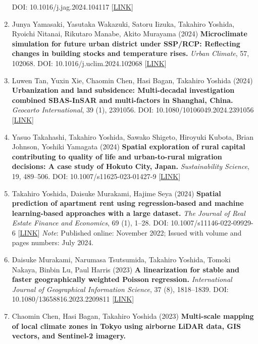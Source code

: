 \documentclass[
]{book}
\begin{document}
\begin{enumerate}
  DOI: 10.1016/j.jag.2024.104117 {[}\href{https://www.sciencedirect.com/science/article/pii/S1569843224004710}{LINK}{]}
\item
  Junya Yamasaki, Yasutaka Wakazuki, Satoru Iizuka, Takahiro Yoshida, Ryoichi Nitanai, Rikutaro Manabe, Akito Murayama (2024)
  \textbf{Microclimate simulation for future urban district under SSP/RCP: Reflecting changes in building stocks and temperature rises.}
  \emph{Urban Climate}, 57, 102068.
  DOI: 10.1016/j.uclim.2024.102068 {[}\href{https://www.sciencedirect.com/science/article/pii/S2212095524002645}{LINK}{]}
\item
  Luwen Tan, Yuxin Xie, Chaomin Chen, Hasi Bagan, Takahiro Yoshida (2024)
  \textbf{Urbanization and land subsidence: Multi-decadal investigation combined SBAS-InSAR and multi-factors in Shanghai, China.}
  \emph{Geocarto International}, 39 (1), 2391056.
  DOI: 10.1080/10106049.2024.2391056 {[}\href{https://www.tandfonline.com/doi/full/10.1080/10106049.2024.2391056}{LINK}{]}
\item
  Yasuo Takahashi, Takahiro Yoshida, Sawako Shigeto, Hiroyuki Kubota, Brian Johnson, Yoshiki Yamagata (2024)
  \textbf{Spatial exploration of rural capital contributing to quality of life and urban-to-rural migration decisions: A case study of Hokuto City, Japan.}
  \emph{Sustainability Science}, 19, 489--506.
  DOI: 10.1007/s11625-023-01427-9 {[}\href{https://link.springer.com/article/10.1007/s11625-023-01427-9}{LINK}{]}
\item
  Takahiro Yoshida, Daisuke Murakami, Hajime Seya (2024)
  \textbf{Spatial prediction of apartment rent using regression-based and machine learning-based approaches with a large dataset.}
  \emph{The Journal of Real Estate Finance and Economics}, 69 (1), 1--28.
  DOI: 10.1007/s11146-022-09929-6 {[}\href{https://link.springer.com/article/10.1007/s11146-022-09929-6}{LINK}{]}
  \emph{Note}: Published online: November 2022; Issued with volume and pages numbers: July 2024.
\item
  Daisuke Murakami, Narumasa Tsutsumida, Takahiro Yoshida, Tomoki Nakaya, Binbin Lu, Paul Harris (2023)
  \textbf{A linearization for stable and faster geographically weighted Poisson regression.}
  \emph{International Journal of Geographical Information Science}, 37 (8), 1818--1839.
  DOI: 10.1080/13658816.2023.2209811 {[}\href{https://www.tandfonline.com/doi/full/10.1080/13658816.2023.2209811}{LINK}{]}
\item
  Chaomin Chen, Hasi Bagan, Takahiro Yoshida (2023)
  \textbf{Multi-scale mapping of local climate zones in Tokyo using airborne LiDAR data, GIS vectors, and Sentinel-2 imagery.}

\end{enumerate}
\end{document}
